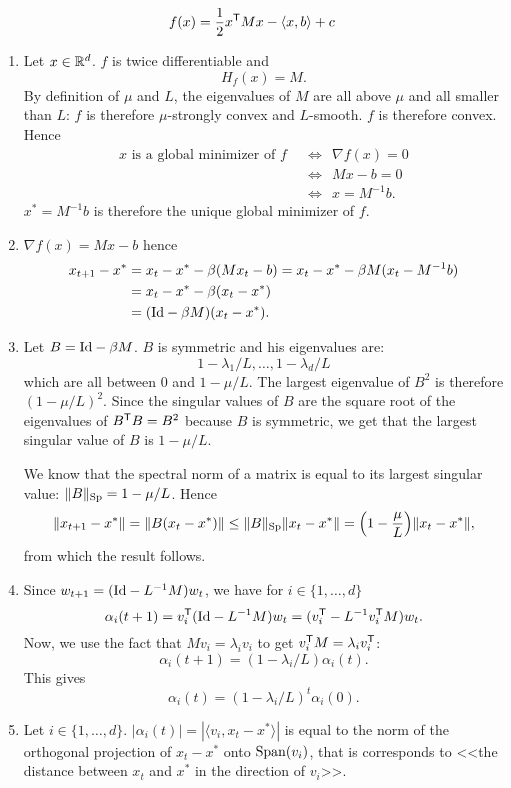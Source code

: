 \documentclass[11pt,nocut]{article}
\begin{document}
\begin{problem}[5 points]\label{p:grad}
	$$
	f(x) = \frac{1}{2} x^{{\sf T}} M x - \langle x,b \rangle + c
	$$
	\begin{enumerate}[label=\normalfont(\textbf{\alph*})]
		\item Let $x \in \mathbb{R}^d$. $f$ is twice differentiable and
			$$
			H_f(x) = M.
			$$
			By definition of $\mu$ and $L$, the eigenvalues of $M$ are all above $\mu$ and all smaller than $L$: $f$ is therefore $\mu$-strongly convex and $L$-smooth. $f$ is therefore convex. Hence 
			\begin{align*}
				x \text{ is a global minimizer of } f
				& \ \ \Longleftrightarrow \ \ \nabla f(x) =0 \\
				& \ \ \Longleftrightarrow \ \ Mx -b =0 \\
				& \ \ \Longleftrightarrow \ \ x = M^{-1} b.
			\end{align*}
			$x^* = M^{-1} b$ is therefore the unique global minimizer of $f$.

		\item $\nabla f(x) = Mx -b$ hence
			\begin{align*}
				x_{t+1} - x^* 
				&= x_t - x^* - \beta (Mx_t -b)
				= x_t - x^* - \beta M (x_t - M^{-1} b)
				\\
				&= x_t - x^* - \beta (x_t -x^*)
				\\
				&= ({{\rm Id}} - \beta M)(x_t - x^*).
			\end{align*}
		\item Let $B = {{\rm Id}} - \beta M$. $B$ is symmetric and his eigenvalues are:
			$$
			1 - \lambda_1 / L, \dots, 1 - \lambda_d/L
			$$
			which are all between $0$ and $1- \mu/L$. The largest eigenvalue of $B^2$ is therefore $(1-\mu/L)^2$. Since the singular values of $B$ are the square root of the eigenvalues of $B^{{\sf T}} B= B^2$ because $B$ is symmetric, we get that the largest singular value of $B$ is $1-\mu/L$.

			We know that the spectral norm of a matrix is equal to its largest singular value: 
			$\|B\|_{\rm Sp} = 1 - \mu /L$. Hence
			$$
			\|x_{t+1} - x^* \| = 
			\| B (x_t-x^*)\| \leq \|B\|_{\rm Sp} \|x_t-x^*\| =
			\Big(1- \frac{\mu}{L}\Big) \|x_t - x^*\|,
			$$
			from which the result follows.
		\item Since $w_{t+1} = ({{\rm Id}} - L^{-1} M) w_t$, we have for $i \in \{1, \dots, d\}$
			$$
			\alpha_i(t+1) 
			= v_i^{{\sf T}} ({{\rm Id}} - L^{-1} M) w_t
			= (v_i^{{\sf T}} - L^{-1} v_i^{{\sf T}} M) w_t.
			$$
			Now, we use the fact that $Mv_i = \lambda_i v_i$ to get $v_i^{{\sf T}} M = \lambda_i v_i^{{\sf T}}$:
			$$
			\alpha_i(t+1)  = (1- \lambda_i/L) \alpha_i(t).
			$$
			This gives
			$$
			\alpha_i(t) = (1-\lambda_i/L)^t \alpha_i(0).
			$$
		\item Let $i\in \{1, \dots, d\}$. $|\alpha_i(t)| = |\langle v_i, x_t-x^* \rangle|$ is equal to the norm of the orthogonal projection of $x_t - x^*$ onto ${{\rm Span}}(v_i)$, that is corresponds to <<the distance between $x_t$ and $x^*$ in the direction of $v_i$>>.
			\\


\end{enumerate}
\end{problem}
\end{document}

